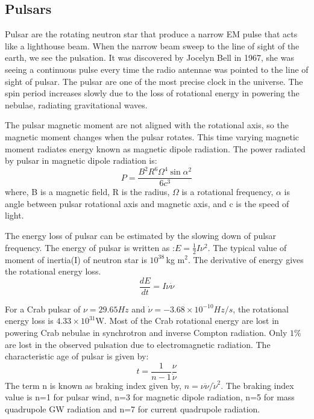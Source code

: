 \documentclass{ttuthes2007}
\begin{document}
\subsection{Pulsars}
Pulsar are the rotating neutron star that produce a narrow \ac{EM} pulse that
acts like a lighthouse beam. When the narrow beam sweep to the line of sight of
the earth, we see the pulsation.  It was discovered by Jocelyn Bell in 1967, she
was seeing a continuous pulse every time the radio antennae was pointed to the
line of sight of pulsar. The pulsar are one of the most precise clock in the
universe. The spin period increases slowly due to the loss of rotational energy
in powering the nebulae, radiating gravitational waves. 

The pulsar magnetic moment are not aligned with the rotational axis, so the
magnetic moment changes when the pulsar rotates. This time varying magnetic
moment radiates energy known as magnetic dipole radiation. The power radiated by
pulsar in magnetic dipole radiation is:
\begin{equation}
P= \frac{B^2R^6\Omega^4\sin{\alpha}^2}{6c^3}
\end{equation}
where, B is a magnetic field, R is the radius, $\Omega$ is a rotational
frequency, $\alpha$ is angle between pulsar rotational axis and magnetic axis,
and c is the speed of light.  

The energy loss of pulsar can be estimated by the slowing down of pulsar
frequency. The energy of pulsar is written as :$E=\frac{1}{2} I \nu^2$. The
typical value of moment of inertia(I) of neutron star is $10^{38}$\,kg m$^2$. The
derivative of energy gives the rotational energy loss.
\begin{equation}
\frac{dE}{dt}= I\nu\dot{\nu}
\end{equation}

For a Crab pulsar of $\nu=29.65Hz$ and $\dot{\nu}= -3.68\times10^{-10}Hz/s$, the
rotational energy loss is $4.33\times10^{31}$W. Most of the Crab rotational energy
are lost in powering Crab nebulae in synchrotron and inverse Compton radiation.
Only $1\%$ are lost  in the observed pulsation due to electromagnetic radiation.
The characteristic age of pulsar is given by:
\begin{equation}
t= \frac{1}{n-1}\frac{\nu}{\dot{\nu}}
\end{equation} 
The term n is known as braking index given by, $n=\nu\ddot{\nu}/\dot{\nu}^2$. 
The braking index value is n=1 for pulsar wind, n=3 for magnetic dipole
radiation, n=5 for mass quadrupole \ac{GW} radiation and n=7 for current
quadrupole radiation.
\end{document}
